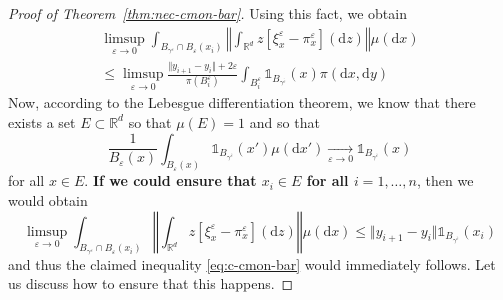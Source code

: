 \documentclass[10pt,a4paper]{amsart}
\newcommand{\R}{\mathbb{R}}
\newcommand{\dd}{\mathrm{d}}
\newcommand{\eps}{\varepsilon}
\begin{document}
\begin{proof}[Proof of Theorem~\ref{thm:nec-cmon-bar}]
Using this fact, we obtain 
     \begin{multline}
         \limsup_{\eps \to 0}\int_{B_{\gamma^\eps} \cap B_\eps(x_i)} \left\Vert \int_{\R^d} z [\xi^\eps_x - \pi^\eps_x](\dd z) \right\Vert \mu(\dd x) \\\leq \limsup_{\eps \to 0} \frac{\Vert y_{i+1} - y_i\Vert + 2\eps}{\pi(B_i^\eps)} \int_{B_i^\eps} \mathds{1}_{B_{\gamma^{\overline{\eps}}}}(x) \pi(\dd x, \dd y)%
     \end{multline}
Now, according to the Lebesgue differentiation theorem, we know that  there exists a set $E \subset \R^d$ so that $\mu(E) = 1$ and so that 
     $$
     \frac1{B_\eps(x)} \int_{B_\eps(x)} \mathds{1}_{B_{\gamma^{\overline{\eps}}}}(x') \mu(\dd x') \xrightarrow[\eps \to 0]{} \mathds{1}_{B_{\gamma^{\overline{\eps}}}}(x)
     $$
     for all $x \in E$. \textbf{If we could ensure that $x_i \in E$ for all $i = 1, \dots,n$}, then we would obtain 
     $$
      \limsup_{\eps \to 0}\int_{B_{\gamma^\eps} \cap B_\eps(x_i)} \left\Vert \int_{\R^d} z [\xi^\eps_x - \pi^\eps_x](\dd z) \right\Vert \mu(\dd x) \leq \Vert y_{i+1} - y_i\Vert \mathds{1}_{B_{\gamma^{\overline{\eps}}}}(x_i) 
     $$
     and thus the claimed inequality \eqref{eq:c-cmon-bar} would immediately follows. Let us discuss how to ensure that this happens. 
     

\end{proof}
\end{document}
